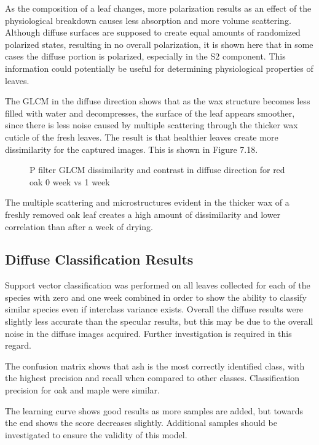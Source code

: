 As the composition of a leaf changes, more polarization results as an effect of the physiological breakdown causes less absorption and more volume scattering.  Although diffuse surfaces are supposed to create equal amounts of randomized polarized states, resulting in no overall polarization, it is shown here that in some cases the diffuse portion is polarized, especially in the S2 component.  This information could potentially be useful for determining physiological properties of leaves.

The GLCM in the diffuse direction shows that as the wax structure becomes less filled with water and decompresses, the surface of the leaf appears smoother, since there is less noise caused by multiple scattering through the thicker wax cuticle of the fresh leaves.  The result is that healthier leaves create more dissimilarity for the captured images.  This is shown in Figure 7.18.
%
\begin{figure}
    \begin{center}
    \end{center}
    \caption{P filter GLCM dissimilarity and contrast in diffuse direction for red oak 0 week vs 1 week}
    \label{fig:polarization}
\end{figure}
%
The multiple scattering and microstructures evident in the thicker wax of a freshly removed oak leaf creates a high amount of dissimilarity and lower correlation than after a week of drying.

\subsection{Diffuse Classification Results}
Support vector classification was performed on all leaves collected for each of the species with zero and one week combined in order to show the ability to classify similar species even if interclass variance exists.  Overall the diffuse results were slightly less accurate than the specular results, but this may be due to the overall noise in the diffuse images acquired.  Further investigation is required in this regard.

The confusion matrix shows that ash is the most correctly identified class, with the highest precision and recall when compared to other classes.  Classification precision for oak and maple were similar.

The learning curve shows good results as more samples are added, but towards the end shows the score decreases slightly.  Additional samples should be investigated to ensure the validity of this model.

